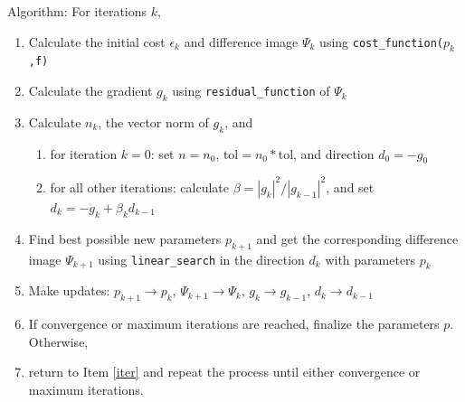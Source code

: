 \documentclass[12pt]{pasj01}
\begin{document}
Algorithm:
For iterations $k$,
\begin{enumerate}
    \item Calculate the initial cost $\epsilon_k$ and difference image $\Psi_k$ using {\tt cost\_function($p_k$,f)}
    \item\label{iter} Calculate the gradient $g_k$ using {\tt residual\_function} of $\Psi_k$
    \item Calculate $n_k$, the vector norm of $g_k$, and 
    \begin{enumerate}
        \item for iteration $k=0$: set $n=n_0$, tol$=n_0*$tol, and direction $d_0=-g_0$
        \item for all other iterations: calculate $\beta=|g_k|^2/|g_{k-1}|^2$, and set $d_k=-g_k+\beta_k d_{k-1}$
    \end{enumerate}
    \item Find best possible new parameters $p_{k+1}$ and get the corresponding difference image $\Psi_{k+1}$ using {\tt linear\_search} in the direction $d_k$ with parameters $p_k$
    \item Make updates: $p_{k+1}\to p_k$, $\Psi_{k+1}\to\Psi_k$, $g_k\to g_{k-1}$, $d_k\to d_{k-1}$
    \item If convergence or maximum iterations are reached, finalize the parameters $p$. Otherwise,
    \item return to Item \ref{iter} and repeat the process until either convergence or maximum iterations.
\end{enumerate}
\end{document}
